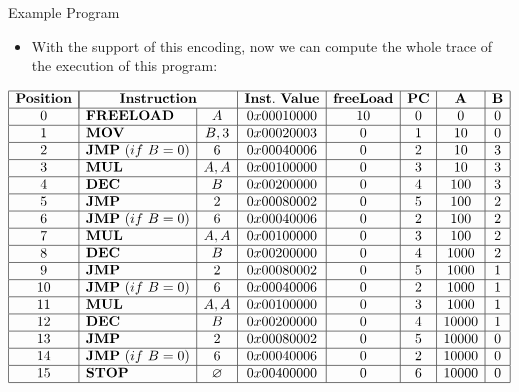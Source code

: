 \begin{frame}[allowframebreaks]{Example Program}
\begin{itemize}
\framebreak
\item With the support of this encoding, now we can compute the whole trace of the execution of this program:
\end{itemize}
\scriptsize
\[
\begin{array}{|c|l|c|c|c|c|c|c|}
\hline
\mathbf{Position} & \multicolumn{2}{|c|}{\mathbf{Instruction}} & \mathbf{Inst.~Value} & \mathbf{freeLoad} & \mathbf{PC} & \mathbf{A} & \mathbf{B} \\ \hline
0 & \mathbf{FREELOAD} & A & 0x00010000 & 10 & 0 & 0 & 0 \\ \hline
1 & \mathbf{MOV} & B, 3 & 0x00020003 & 0 & 1 & 10 & 0 \\ \hline
2 & \mathbf{JMP}~(if~B = 0) & 6 & 0x00040006 & 0 & 2 & 10 & 3 \\ \hline
3 & \mathbf{MUL} & A, A & 0x00100000 & 0 & 3 & 10 & 3 \\ \hline
4 & \mathbf{DEC} & B & 0x00200000 & 0 & 4 & 100 & 3 \\ \hline
5 & \mathbf{JMP} & 2 & 0x00080002 & 0 & 5 & 100 & 2 \\ \hline
6 & \mathbf{JMP}~(if~B = 0) & 6 & 0x00040006 & 0 & 2 & 100 & 2 \\ \hline
7 & \mathbf{MUL} & A, A & 0x00100000 & 0 & 3 & 100 & 2 \\ \hline
8 & \mathbf{DEC} & B & 0x00200000 & 0 & 4 & 1000 & 2 \\ \hline
9 & \mathbf{JMP} & 2 & 0x00080002 & 0 & 5 & 1000 & 1 \\ \hline
10 & \mathbf{JMP}~(if~B = 0) & 6 & 0x00040006 & 0 & 2 & 1000 & 1 \\ \hline
11 & \mathbf{MUL} & A, A & 0x00100000 & 0 & 3 & 1000 & 1 \\ \hline
12 & \mathbf{DEC} & B & 0x00200000 & 0 & 4 & 10000 & 1 \\ \hline
13 & \mathbf{JMP} & 2 & 0x00080002 & 0 & 5 & 10000 & 0 \\ \hline
14 & \mathbf{JMP}~(if~B = 0) & 6 & 0x00040006 & 0 & 2 & 10000 & 0 \\ \hline
15 & \mathbf{STOP} & \emptyset & 0x00400000 & 0 & 6 & 10000 & 0 \\ \hline
\end{array}
\]
\end{frame}





